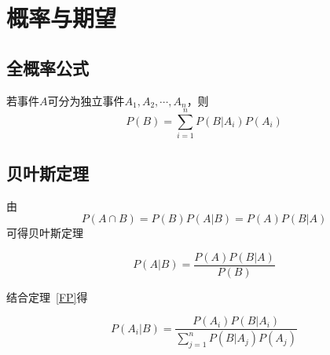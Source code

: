 \section{概率与期望}
\subsection{全概率公式}
\begin{theorem}\label{FP}
    若事件$A$可分为独立事件$A_1,A_2,\cdots,A_n$，则
    \begin{displaymath}
        P(B)=\sum_{i=1}^n{P(B|A_i)P(A_i)}
    \end{displaymath}
\end{theorem}
\subsection{贝叶斯定理}
由\begin{displaymath}
    P(A\cap B)=P(B)P(A|B)=P(A)P(B|A)
\end{displaymath}
可得贝叶斯定理
\begin{theorem}
    \begin{displaymath}
        P(A|B)=\frac{P(A)P(B|A)}{P(B)}
    \end{displaymath}
\end{theorem}
结合定理~\ref{FP}得
\begin{inference}
    \begin{displaymath}
        P(A_i|B)=\frac{P(A_i)P(B|A_i)}{\displaystyle \sum_{j=1}^n{P(B|A_j)P(A_j)}}
    \end{displaymath}
\end{inference}
